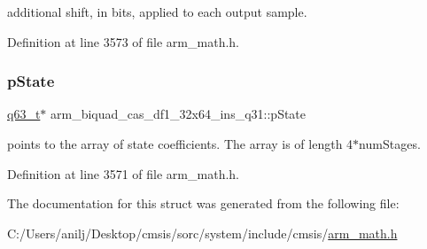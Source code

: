 additional shift, in bits, applied to each output sample. 

Definition at line 3573 of file arm\+\_\+math.\+h.

\mbox{\label{structarm__biquad__cas__df1__32x64__ins__q31_a4c899cdfaf2bb955323e93637bd662e0}} 
\subsubsection{\texorpdfstring{p\+State}{pState}}
{\footnotesize\ttfamily \hyperlink{arm__math_8h_a5aea1cb12fc02d9d44c8abf217eaa5c6}{q63\+\_\+t}$\ast$ arm\+\_\+biquad\+\_\+cas\+\_\+df1\+\_\+32x64\+\_\+ins\+\_\+q31\+::p\+State}

points to the array of state coefficients. The array is of length 4$\ast$num\+Stages. 

Definition at line 3571 of file arm\+\_\+math.\+h.



The documentation for this struct was generated from the following file\+:\begin{DoxyCompactItemize}
\item 
C\+:/\+Users/anilj/\+Desktop/cmsis/sorc/system/include/cmsis/\hyperlink{arm__math_8h}{arm\+\_\+math.\+h}\end{DoxyCompactItemize}
